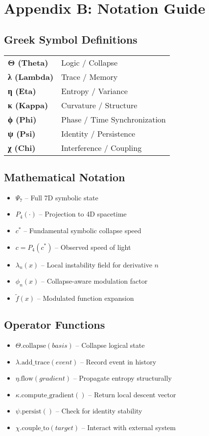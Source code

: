 
\chapter*{Appendix B: Notation Guide}

\section*{Greek Symbol Definitions}

\begin{tabular}{ll}
\textbf{Θ (Theta)} & Logic / Collapse \\
\textbf{λ (Lambda)} & Trace / Memory \\
\textbf{η (Eta)} & Entropy / Variance \\
\textbf{κ (Kappa)} & Curvature / Structure \\
\textbf{ϕ (Phi)} & Phase / Time Synchronization \\
\textbf{ψ (Psi)} & Identity / Persistence \\
\textbf{χ (Chi)} & Interference / Coupling \\
\end{tabular}

\bigskip

\section*{Mathematical Notation}

\begin{itemize}
\item $\Psi_7$ – Full 7D symbolic state
\item $P_4(\cdot)$ – Projection to 4D spacetime
\item $c^*$ – Fundamental symbolic collapse speed
\item $c = P_4(c^*)$ – Observed speed of light
\item $\lambda_n(x)$ – Local instability field for derivative $n$
\item $\phi_n(x)$ – Collapse-aware modulation factor
\item $\tilde{f}(x)$ – Modulated function expansion
\end{itemize}

\section*{Operator Functions}

\begin{itemize}
\item $\Theta.\text{collapse}(basis)$ – Collapse logical state
\item $\lambda.\text{add\_trace}(event)$ – Record event in history
\item $\eta.\text{flow}(gradient)$ – Propagate entropy structurally
\item $\kappa.\text{compute\_gradient}()$ – Return local descent vector
\item $\psi.\text{persist}()$ – Check for identity stability
\item $\chi.\text{couple\_to}(target)$ – Interact with external system
\end{itemize}

